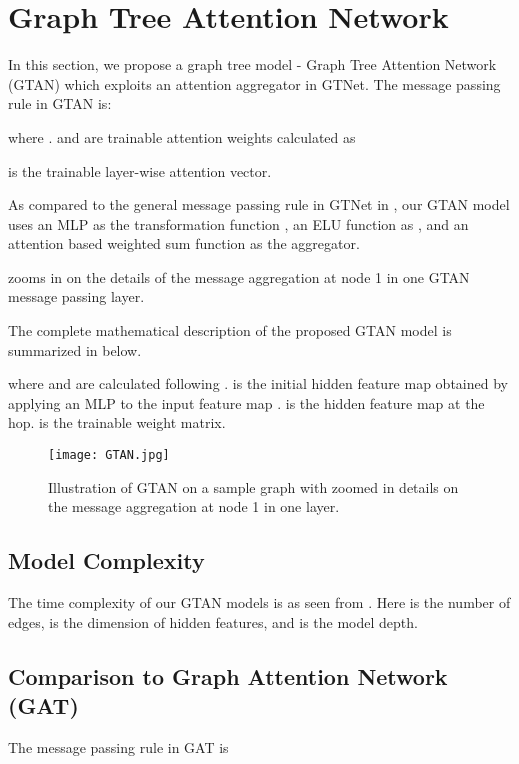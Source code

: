 \documentclass[lettersize,journal]{IEEEtran}
\theoremstyle{plain}
\theoremstyle{definition}
\theoremstyle{remark}
\begin{document}
\section{Graph Tree Attention Network}
\label{GTAN}
In this section, we propose a graph tree model - Graph Tree Attention Network (GTAN) which exploits an attention aggregator in GTNet. The message passing rule in GTAN is:

where .  and  are trainable attention weights calculated as

 is the trainable layer-wise attention vector.

As compared to the general message passing rule in GTNet in , our GTAN model uses an MLP as the transformation function , an ELU function as , and an attention based weighted sum function as the aggregator.

 zooms in on the details of the message aggregation at node 1 in one GTAN message passing layer. 

The complete mathematical description of the proposed GTAN model is summarized in below.

where  and  are calculated following .  is the initial hidden feature map obtained by applying an MLP to the input feature map .  is the hidden feature map at the  hop.  is the trainable weight matrix.

\begin{figure}[h]
	\begin{center}
		\texttt{[image: GTAN.jpg]}
		\caption{Illustration of GTAN on a sample graph with zoomed in details on the message aggregation at node 1 in one layer.}
		\label{fig:GTAN}
	\end{center}
\end{figure}

\subsection{Model Complexity}
The time complexity of our GTAN models is  as seen from . Here  is the number of edges,  is the dimension of hidden features, and  is the model depth. 

\subsection{Comparison to Graph Attention Network (GAT)}
\label{compare:GAT}
The message passing rule in GAT is
\end{document}
